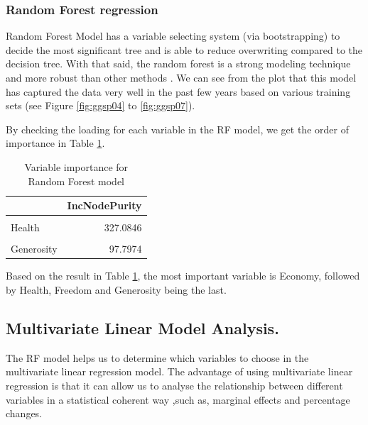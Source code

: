 \documentclass[11pt,a4paper,]{article}
\begin{document}
\hypertarget{random-forest-regression}{%
\subsubsection{Random Forest regression}\label{random-forest-regression}}

Random Forest Model has a variable selecting system (via bootstrapping) to decide the most significant tree and is able to reduce overwriting compared to the decision tree. With that said, the random forest is a strong modeling technique and more robust than other methods \autocite{liberman2017}. We can see from the plot that this model has captured the data very well in the past few years based on various training sets (see Figure \ref{fig:ggsp04} to \ref{fig:ggsp07}).

By checking the loading for each variable in the RF model, we get the order of importance in Table \ref{tab:varimp}.

\newpage
\begin{table}

\caption{\label{tab:varimp}Variable importance for Random Forest model}
\centering
\begin{tabular}[t]{l|r}
\hline
  & IncNodePurity\\
\hline
\cellcolor{gray!6}{Economy} & \cellcolor{gray!6}{348.6690}\\
\hline
Health & 327.0846\\
\hline
\cellcolor{gray!6}{Freedom} & \cellcolor{gray!6}{169.3299}\\
\hline
Generosity & 97.7974\\
\hline
\end{tabular}
\end{table}

Based on the result in Table \ref{tab:varimp}, the most important variable is Economy, followed by Health, Freedom and Generosity being the last.

\hypertarget{multivariate-linear-model-analysis.}{%
\subsection{Multivariate Linear Model Analysis.}\label{multivariate-linear-model-analysis.}}

The RF model helps us to determine which variables to choose in the multivariate linear regression model. The advantage of using multivariate linear regression is that it can allow us to analyse the relationship between different variables in a statistical coherent way \autocite{voxco2022},such as, marginal effects and percentage changes.
\end{document}
